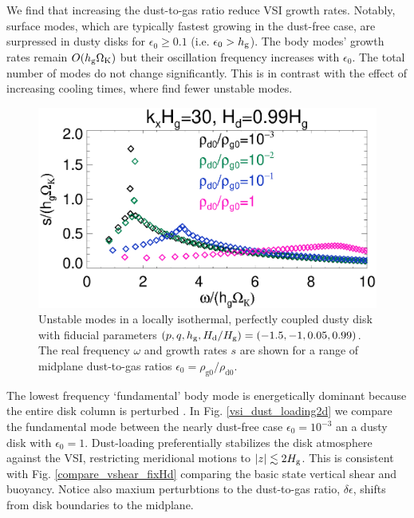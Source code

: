 We find that increasing the dust-to-gas ratio reduce VSI growth
rates. Notably, surface modes, which are typically fastest growing in
the dust-free case, are surpressed in dusty disks for $\epsilon_0\geq
0.1$ (i.e. $\epsilon_0> h_\mathrm{g}$).   
The body modes' growth rates remain $ O(h_\mathrm{g}\Omega_{\rm K})$ 
but their oscillation frequency increases with
$\epsilon_0$. %
The total number of modes do not change
significantly. This is in contrast with the effect of increasing
cooling times, where  find fewer unstable modes.

\begin{figure}
  \includegraphics[width=\linewidth]{figures/compare_eigenvals_kx30Hd1} 
  \caption{Unstable modes in a locally isothermal, perfectly coupled
    dusty disk with fiducial parameters
    $(p,q,h_\mathrm{g}, H_\mathrm{d}/H_\mathrm{g} )=(-1.5,-1,0.05, 0.99)$. The real
    frequency $\omega$ and growth rates $s$ are shown for a range of
    midplane dust-to-gas ratios $\epsilon_0=\rho_\mathrm{g0}/\rho_\mathrm{d0}$. 
    \label{vsi_dust_loading}
    }
\end{figure}

The lowest frequency `fundamental' body mode is energetically dominant
because the entire disk column is perturbed \citep[cf. surface modes
  which only disturb the disk boundaries,][]{umurhan16c}. In Fig. \ref{vsi_dust_loading2d}
we compare the fundamental mode between the nearly 
dust-free case $\epsilon_0=10^{-3}$ an a dusty disk with
$\epsilon_0=1$. Dust-loading preferentially
stabilizes the disk atmosphere against the VSI, restricting
meridional motions to $|z|\lesssim 2H_\mathrm{g}$. 
This is consistent with Fig. \ref{compare_vshear_fixHd} comparing the basic state vertical
shear and buoyancy. Notice also maxium perturbtions to the dust-to-gas ratio,
$\delta\epsilon$, shifts from disk boundaries 
to the midplane.  

